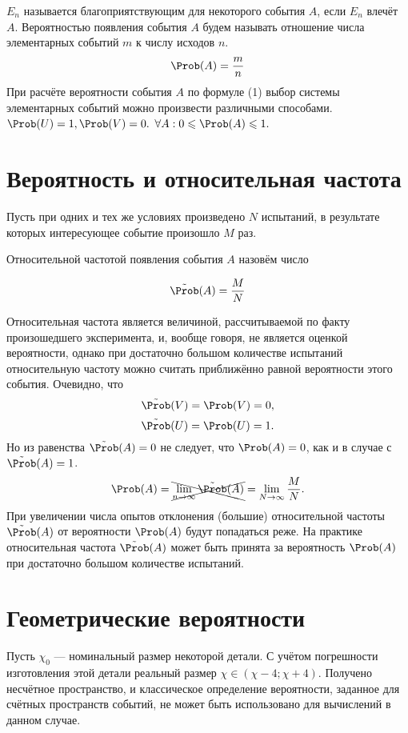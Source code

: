  $E_n$ называется благоприятствующим для некоторого события $A$, если $E_n$ влечёт $A$.
 Вероятностью появления события $A$ будем называть отношение числа элементарных событий $m$ к числу исходов $n$.
\begin{equation}
	\Prob (A) = \frac{m}{n} \hfill
\end{equation}
\addition При расчёте вероятности события $A$ по формуле (1) выбор системы элементарных событий можно произвести различными способами.
\conclusion $\Prob(U) = 1, \Prob(V) = 0.$
\conclusion $\forall A: 0 \leqslant \Prob(A) \leqslant 1.$
\section{Вероятность и относительная частота}
\begin{definition}
	Пусть при одних и тех же условиях произведено $N$ испытаний, в результате которых интересующее событие произошло $M$ раз.
\end{definition}

Относительной частотой появления события $A$ назовём число

\begin{equation}
	\tilde{\Prob}(A) = \frac{M}{N}
\end{equation}

Относительная частота является величиной, рассчитываемой по факту произошедшего эксперимента, и, вообще говоря, не является оценкой вероятности, однако при достаточно большом количестве испытаний относительную частоту можно считать приближённо равной вероятности этого события.
Очевидно, что
$$\tilde{\Prob}(V) = \Prob(V) = 0,$$
$$\tilde{\Prob}(U) = \Prob(U) = 1.$$
Но из равенства $\tilde{\Prob}(A) = 0$ не следует, что $\Prob(A) = 0$, как и в случае с  $\tilde{\Prob}(A) = 1$.
\[
	\Prob(A) = \xcancel {\lim_{n\to\infty} \tilde{\Prob}(A)} = \lim_{N\to\infty} \frac{M}{N}.
\]
При увеличении числа опытов отклонения (большие) относительной частоты $\tilde{\Prob}(A)$ от вероятности $\Prob(A)$ будут попадаться реже. На практике относительная частота $\tilde{\Prob}(A)$ может быть принята за вероятность $\Prob(A)$ при достаточно большом количестве испытаний.

\section{Геометрические вероятности}
Пусть $\chi_0$ --- номинальный размер некоторой детали. С учётом погрешности изготовления этой детали реальный размер $\chi \in (\chi - 4; \chi + 4)$. Получено несчётное пространство, и классическое определение вероятности, заданное для счётных пространств событий, не может быть использовано для вычислений в данном случае.

